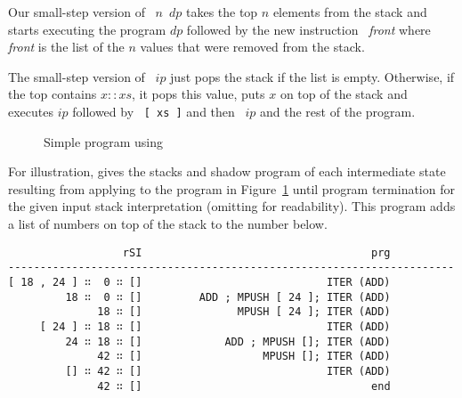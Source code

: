 Our small-step version of ~$n$~$dp$ takes the top $n$ elements from the stack
and starts executing the program $dp$ followed by 
the new instruction ~\textit{front} where
\textit{front} is the list of the $n$ values that were removed from
the stack.
\ConcreteprogStepDIP

The small-step version of ~$ip$ just pops the stack if the
list is empty.
Otherwise, if the top contains $x :: xs$, it pops this value, puts $x$
on top of the stack and executes $ip$ followed by
~\texttt{[ xs ]} and then ~$ip$ and the rest of
the program.
\ConcreteprogStepITER

\begin{figure}[tp]
  \ConcreteExampleITER
  \caption{Simple program using }
  \label{fig:ITER-ADD}
\end{figure}
For illustration, 
 gives the stacks and shadow program of
each intermediate state resulting from applying  to
the program in Figure~\ref{fig:ITER-ADD} until program termination
for the given input stack interpretation (omitting  for
readability).
This program adds a list of numbers on top of the stack to the number below.

\begin{table}[tp]
\begin{verbatim}
                  rSI                                    prg
----------------------------------------------------------------------
[ 18 , 24 ] ∷  0 ∷ []                             ITER (ADD)
         18 ∷  0 ∷ []         ADD ; MPUSH [ 24 ]; ITER (ADD)
              18 ∷ []               MPUSH [ 24 ]; ITER (ADD)
     [ 24 ] ∷ 18 ∷ []                             ITER (ADD)
         24 ∷ 18 ∷ []             ADD ; MPUSH []; ITER (ADD)
              42 ∷ []                   MPUSH []; ITER (ADD)
         [] ∷ 42 ∷ []                             ITER (ADD)
              42 ∷ []                                    end
\end{verbatim}
\caption{Program states during execution of Figure~\ref{fig:ITER-ADD}}
\label{prog-step:ITER-ADD}
\end{table}


